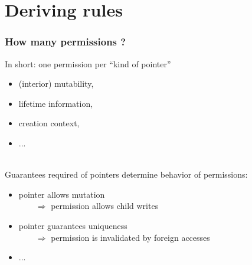 \section{Deriving rules}

\begin{frame}
    \frametitle{How many permissions ?}
    In short: one permission per ``kind of pointer''
    \begin{itemize}
        \item (interior) mutability,
        \item lifetime information,
        \item creation context,
        \item ...
    \end{itemize}~\\

    Guarantees required of pointers determine behavior of permissions:
    \begin{itemize}
        \item pointer allows mutation \\
            \(\qquad\Rightarrow\) permission allows child writes
        \item pointer guarantees uniqueness\\
            \(\qquad\Rightarrow\) permission is invalidated by foreign accesses
        \item ...
    \end{itemize}
\end{frame}

